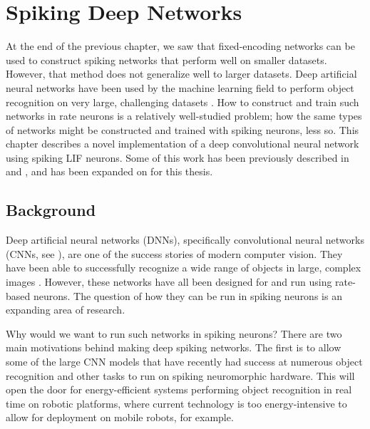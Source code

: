 \chapter{Spiking Deep Networks}


At the end of the previous chapter,
we saw that fixed-encoding networks can be used to construct spiking networks
that perform well on smaller datasets.
However, that method does not generalize well to larger datasets.
Deep artificial neural networks have been used by the machine learning field
to perform object recognition on very large, challenging datasets \parencite{Krizhevsky2012}.
How to construct and train such networks in rate neurons
is a relatively well-studied problem;
how the same types of networks might be constructed and trained
with spiking neurons, less so.
This chapter describes a novel implementation of
a deep convolutional neural network using spiking LIF neurons.
Some of this work has been previously described in
\textcite{Hunsberger2015} and \textcite{Hunsberger2016},
and has been expanded on for this thesis.


\section{Background}

Deep artificial neural networks (DNNs),
specifically convolutional neural networks (CNNs, see ),
are one of the success stories of modern computer vision.
They have been able to successfully recognize a wide range of objects
in large, complex images \parencite[\eg/][]{Krizhevsky2012}.
However, these networks have all been designed for and run using rate-based neurons.
The question of how they can be run in spiking neurons
is an expanding area of research.

Why would we want to run such networks in spiking neurons?
There are two main motivations behind making deep spiking networks.
The first is to allow some of the large CNN models
that have recently had success at numerous object recognition and other tasks
to run on spiking neuromorphic hardware.
This will open the door for energy-efficient systems
performing object recognition in real time on robotic platforms,
where current technology is too energy-intensive
to allow for deployment on mobile robots, for example.

